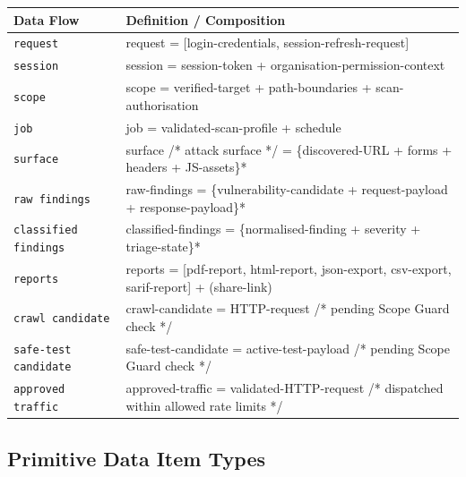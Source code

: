 \documentclass[11pt,a4paper]{article}
\begin{document}
\begin{center}
\small
\begin{tabular}{p{3.4cm} p{12.3cm}}
\toprule
\textbf{Data Flow} & \textbf{Definition / Composition} \\
\midrule
\texttt{request} & request = [login-credentials, session-refresh-request] \\
\addlinespace
\texttt{session} & session = session-token + organisation-permission-context \\
\addlinespace
\texttt{scope} & scope = verified-target + path-boundaries + scan-authorisation \\
\addlinespace
\texttt{job} & job = validated-scan-profile + schedule \\
\addlinespace
\texttt{surface} & surface /* attack surface */ = \{discovered-URL + forms + headers + JS-assets\}* \\
\addlinespace
\texttt{raw findings} & raw-findings = \{vulnerability-candidate + request-payload + response-payload\}* \\
\addlinespace
\texttt{classified findings} & classified-findings = \{normalised-finding + severity + triage-state\}* \\
\addlinespace
\texttt{reports} & reports = [pdf-report, html-report, json-export, csv-export, sarif-report] + (share-link) \\
\addlinespace
\texttt{crawl candidate} & crawl-candidate = HTTP-request /* pending Scope Guard check */ \\
\addlinespace
\texttt{safe-test candidate} & safe-test-candidate = active-test-payload /* pending Scope Guard check */ \\
\addlinespace
\texttt{approved traffic} & approved-traffic = validated-HTTP-request /* dispatched within allowed rate limits */ \\
\bottomrule
\end{tabular}
\end{center}

\subsection{Primitive Data Item Types}
\end{document}
